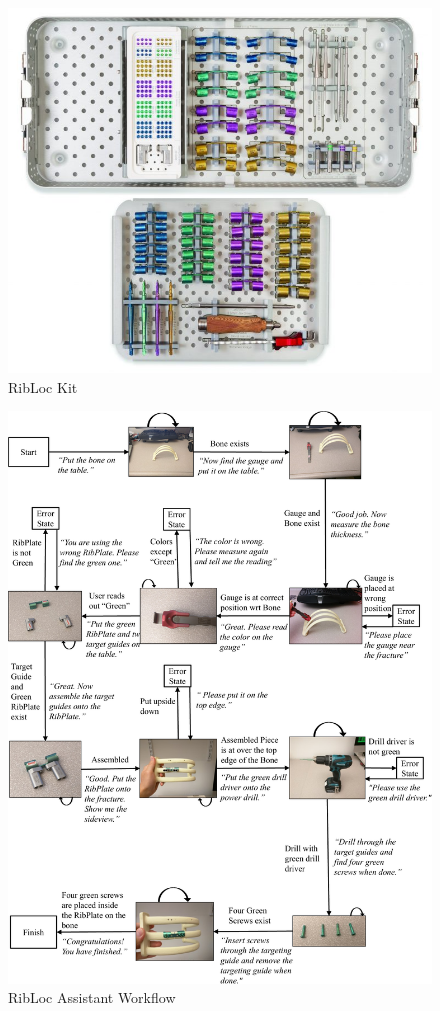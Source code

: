 

\begin{figure}
\centering
\includegraphics[width=0.5\linewidth]{FIGS/RibLoc.jpg}
\caption{RibLoc Kit}
\label{fig:ribloc}
\end{figure}

\begin{figure}
\centering
\includegraphics[width=\linewidth]{FIGS/ribloc-fsm-crop.pdf}
\caption{RibLoc Assistant Workflow}
\label{fig:ribloc-app}
\end{figure}


